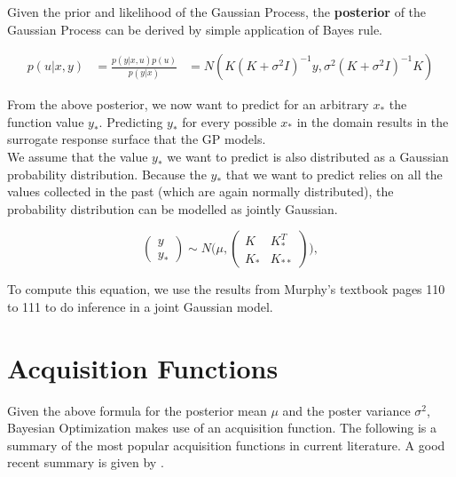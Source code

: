 
Given the prior and likelihood of the Gaussian Process, the \textbf{posterior} of the Gaussian Process can be derived by simple application of Bayes rule.

\begin{align}
p(u | x, y) &= \frac{ p(y | x, u) p(u) }{p(y | x)}
& = N( K(K +\sigma^2 I)^{-1}y, \sigma^2 (K + \sigma^2 I)^{-1} K )
\end{align}

From the above posterior, we now want to predict for an arbitrary $x_*$ the function value $y_*$.
Predicting $y_*$ for every possible $x_*$ in the domain results in the surrogate response surface that the GP models. \\

We assume that the value $y_*$ we want to predict is also distributed as a Gaussian probability distribution. 
Because the $y_*$ that we want to predict relies on all the values collected in the past (which are again normally distributed), the probability distribution can be modelled as jointly Gaussian.

\begin{equation}
\begin{pmatrix} y \\
y_* \end{pmatrix} \sim N\Biggl(\mu,\begin{pmatrix} K & K^T_*\\
 K_* & K_{**} \end{pmatrix}\Biggr),
\end{equation}

To compute this equation, we use the results from Murphy's textbook \citep{Murphy} pages 110 to 111 to do inference in a joint Gaussian model.

\section{Acquisition Functions}

Given the above formula for the posterior mean $\mu$ and the poster variance $\sigma^2$, Bayesian Optimization makes use of an acquisition function.
The following is a summary of the most popular acquisition functions in current literature.
A good recent summary is given by \citep{AcquisitionFunctionsMaximizing}.


